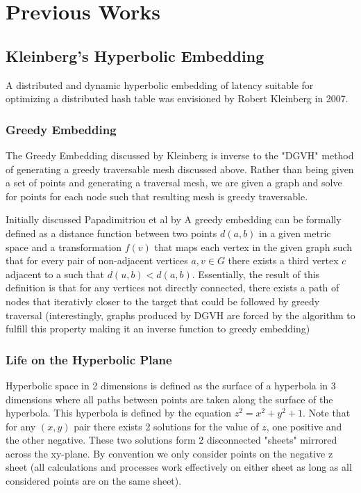 \section{Previous Works}

\subsection{Kleinberg's Hyperbolic Embedding}
A distributed and dynamic hyperbolic embedding of latency suitable for optimizing a distributed hash table was envisioned by Robert Kleinberg in 2007.

\subsubsection{Greedy Embedding}
The Greedy Embedding discussed by Kleinberg is inverse to the "DGVH" method of generating a greedy traversable mesh discussed above.
Rather than being given a set of points and generating a traversal mesh, we are given a graph and solve for points for each node such that resulting mesh is greedy traversable.

Initially discussed Papadimitriou et al\cite{papadimitriou2004conjecture} by A greedy embedding can be formally defined as a distance function between two points $d(a,b)$ in a given metric space and a transformation $f(v)$ that maps each vertex in the given graph such that for every pair of non-adjacent vertices $a,v\in G$ there exists a third vertex $c$ adjacent to a such that $d(u,b) < d(a,b)$. 
Essentially, the result of this definition is that for any vertices not directly connected, there exists a path of nodes that iterativly closer to the target that could be followed by greedy traversal (interestingly, graphs produced by DGVH are forced by the algorithm to fulfill this property making it an inverse function to greedy embedding)

\subsubsection{Life on the Hyperbolic Plane}
Hyperbolic space in 2 dimensions is defined as the surface of a hyperbola in 3 dimensions where all paths between points are taken along the surface of the hyperbola.
This hyperbola is defined by the equation $z^{2}=x^{2}+y^{2}+1$.
Note that for any $(x,y)$ pair there exists 2 solutions for the value of $z$, one positive and the other negative.
These two solutions form 2 disconnected "sheets" mirrored across the xy-plane.
By convention we only consider points on the negative z sheet (all calculations and processes work effectively on either sheet as long as all considered points are on the same sheet).

